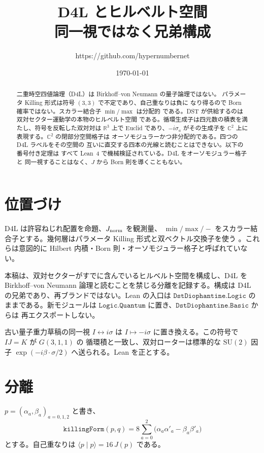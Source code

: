 \documentclass[dvipdfmx,11pt,a4paper]{jsarticle}
\title{D4L とヒルベルト空間\\
同一視ではなく兄弟構成}
\author{https://github.com/hypernumbernet}
\date{\today}
\theoremstyle{definition}
\theoremstyle{remark}
\newcommand{\Jnorm}{J_{\rm norm}}
\begin{document}
\maketitle

\begin{abstract}
二重時空四値論理（D4L）は Birkhoff--von Neumann の量子論理ではない。
パラメータ Killing 形式は符号 $(3,3)$ で不定であり、自己重なりは負に
なり得るので Born 確率ではない。スカラー結合子 $\min/\max$ は分配的
である。DST が供給するのは双対セクター運動学の本物のヒルベルト空間
である。循環生成子は四元数の積表を満たし、符号を反転した双対対は
$\mathbb{R}^3$ 上で Euclid であり、$-i\sigma_a$ がその生成子を
$\mathbb{C}^2$ 上に表現する。$\mathbb{C}^2$ の閉部分空間格子は
オーソモジュラーかつ非分配的である。四つの D4L ラベルをその空間の
互いに直交する四本の光線と読むことはできない。以下の番号付き定理は
すべて Lean~4 で機械検証されている。D4L をオーソモジュラー格子と
同一視することはなく、$J$ から Born 則を導くこともない。
\end{abstract}

\section{位置づけ}
\label{sec:pos}

D4L \cite{D4L2026} は許容ねじれ配置を命題、$\Jnorm$ を観測量、
$\min/\max/-$ をスカラー結合子とする。幾何層はパラメータ Killing
形式と双ベクトル交換子を使う \cite{Diophantine2026}。これらは意図的に
Hilbert 内積・Born 則・オーソモジュラー格子と呼ばれていない。

本稿は、双対セクターがすでに含んでいるヒルベルト空間を構成し、D4L を
Birkhoff--von Neumann 論理と読むことを禁じる分離を記録する。構成は
D4L の兄弟であり、再ブランドではない。Lean の入口は
$\texttt{DstDiophantine.Logic}$ のままである。新モジュールは
$\texttt{Logic.Quantum}$ に置き、$\texttt{DstDiophantine.Basic}$ からは
再エクスポートしない。

古い量子重力草稿の同一視 $I\leftrightarrow i\sigma$ は
$I\mapsto -i\sigma$ に置き換える。この符号で $IJ=K$ が $G(3,1,1)$ の
循環積と一致し、双対ローターは標準的な $\mathrm{SU}(2)$ 因子
$\exp(-i\beta\cdot\sigma/2)$ へ送られる。Lean を正とする。

\section{分離}
\label{sec:sep}

$p=(\alpha_a,\beta_a)_{a=0,1,2}$ と書き、
\[
\texttt{killingForm}(p,q)
= 8\sum_{a=0}^{2}\bigl(\alpha_a\alpha'_a-\beta_a\beta'_a\bigr)
\]
とする。自己重なりは $\langle p\mid p\rangle=16\,J(p)$ である。
\end{document}
